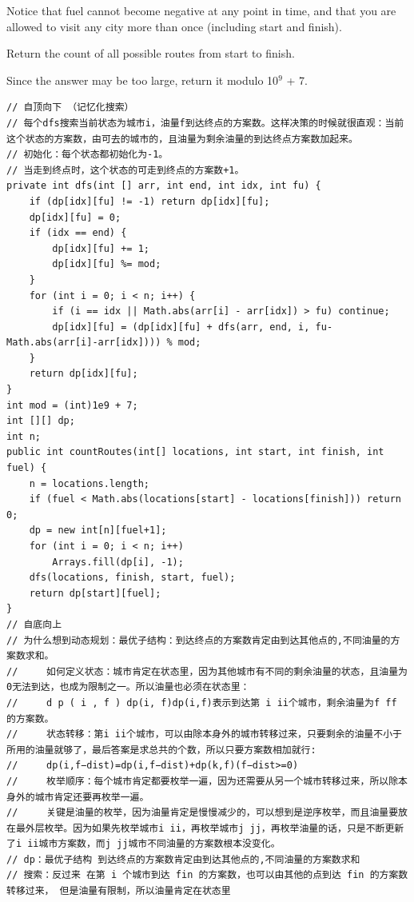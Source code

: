 \documentclass[9pt, b5paper]{article}
\begin{document}
Notice that fuel cannot become negative at any point in time, and that you are allowed to visit any city more than once (including start and finish).

Return the count of all possible routes from start to finish.

Since the answer may be too large, return it modulo 10$^{\text{9}}$ + 7.
\begin{verbatim}
// 自顶向下 （记忆化搜索）
// 每个dfs搜索当前状态为城市i，油量f到达终点的方案数。这样决策的时候就很直观：当前这个状态的方案数，由可去的城市的，且油量为剩余油量的到达终点方案数加起来。
// 初始化：每个状态都初始化为-1。
// 当走到终点时，这个状态的可走到终点的方案数+1。
private int dfs(int [] arr, int end, int idx, int fu) {
    if (dp[idx][fu] != -1) return dp[idx][fu];
    dp[idx][fu] = 0;
    if (idx == end) {
        dp[idx][fu] += 1;
        dp[idx][fu] %= mod;
    }
    for (int i = 0; i < n; i++) {
        if (i == idx || Math.abs(arr[i] - arr[idx]) > fu) continue;
        dp[idx][fu] = (dp[idx][fu] + dfs(arr, end, i, fu-Math.abs(arr[i]-arr[idx]))) % mod;
    }
    return dp[idx][fu];
}
int mod = (int)1e9 + 7;
int [][] dp;
int n;
public int countRoutes(int[] locations, int start, int finish, int fuel) {
    n = locations.length;
    if (fuel < Math.abs(locations[start] - locations[finish])) return 0;
    dp = new int[n][fuel+1];
    for (int i = 0; i < n; i++) 
        Arrays.fill(dp[i], -1);
    dfs(locations, finish, start, fuel);
    return dp[start][fuel];
}
// 自底向上
// 为什么想到动态规划：最优子结构：到达终点的方案数肯定由到达其他点的,不同油量的方案数求和。
//     如何定义状态：城市肯定在状态里，因为其他城市有不同的剩余油量的状态，且油量为0无法到达，也成为限制之一。所以油量也必须在状态里：
//     d p ( i , f ) dp(i, f)dp(i,f)表示到达第 i ii个城市，剩余油量为f ff 的方案数。
//     状态转移：第i ii个城市，可以由除本身外的城市转移过来，只要剩余的油量不小于所用的油量就够了，最后答案是求总共的个数，所以只要方案数相加就行:
//     dp(i,f−dist)=dp(i,f−dist)+dp(k,f)(f−dist>=0)
//     枚举顺序：每个城市肯定都要枚举一遍，因为还需要从另一个城市转移过来，所以除本身外的城市肯定还要再枚举一遍。
//     关键是油量的枚举，因为油量肯定是慢慢减少的，可以想到是逆序枚举，而且油量要放在最外层枚举。因为如果先枚举城市i ii，再枚举城市j jj，再枚举油量的话，只是不断更新了i ii城市方案数，而j jj城市不同油量的方案数根本没变化。
// dp：最优子结构 到达终点的方案数肯定由到达其他点的,不同油量的方案数求和
// 搜索：反过来 在第 i 个城市到达 fin 的方案数，也可以由其他的点到达 fin 的方案数转移过来， 但是油量有限制，所以油量肯定在状态里

\end{verbatim}
\end{document}
